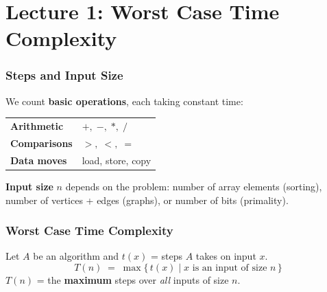 \documentclass[11pt]{article}
\begin{document}
\part*{\textcolor{utnavy}{Lecture 1: Worst Case Time Complexity}}

\section{Steps and Input Size}

We count \textbf{basic operations}, each taking constant time:

\begin{center}
\renewcommand{\arraystretch}{1.4}
\begin{tabular}{l l}
\textcolor{heapblue}{\bfseries Arithmetic} & $+,\;-,\;*,\;/$ \\
\textcolor{heapblue}{\bfseries Comparisons} & $>,\;<,\;=$ \\
\textcolor{heapblue}{\bfseries Data moves} & load, store, copy \\
\end{tabular}
\end{center}

\textbf{Input size} $n$ depends on the problem: number of array elements (sorting), number of vertices + edges (graphs), or number of bits (primality).

\section{Worst Case Time Complexity}

\begin{defbox}
Let $A$ be an algorithm and $t(x)$ = steps $A$ takes on input $x$.
\[
  T(n)\;=\;\max\!\big\{\, t(x)\;\big|\; x \text{ is an input of size } n \,\big\}
\]
$T(n)$ = the \textbf{maximum} steps over \emph{all} inputs of size $n$.
\end{defbox}
\end{document}
